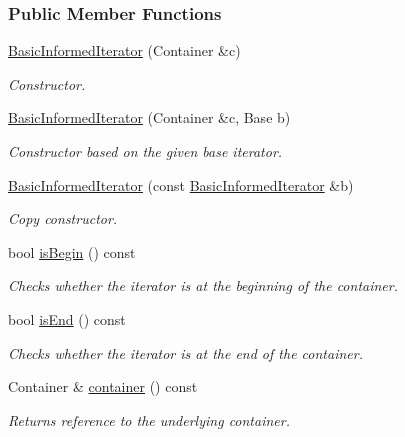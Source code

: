 \subsubsection*{Public Member Functions}
\begin{DoxyCompactItemize}
\item 
\hyperlink{structslb_1_1core_1_1util_1_1BasicInformedIterator_a5df42d0174c2107d33c2c797b6510cd9}{Basic\+Informed\+Iterator} (Container \&c)
\begin{DoxyCompactList}\small\item\em Constructor. \end{DoxyCompactList}\item 
\hyperlink{structslb_1_1core_1_1util_1_1BasicInformedIterator_a1703216a7bd1c0d0a0dd02ed5a946ad9}{Basic\+Informed\+Iterator} (Container \&c, Base b)
\begin{DoxyCompactList}\small\item\em Constructor based on the given base iterator. \end{DoxyCompactList}\item 
\hyperlink{structslb_1_1core_1_1util_1_1BasicInformedIterator_ad87320b140e204fb3a1878ec244fbab2}{Basic\+Informed\+Iterator} (const \hyperlink{structslb_1_1core_1_1util_1_1BasicInformedIterator}{Basic\+Informed\+Iterator} \&b)
\begin{DoxyCompactList}\small\item\em Copy constructor. \end{DoxyCompactList}\item 
bool \hyperlink{structslb_1_1core_1_1util_1_1BasicInformedIterator_ac9c0870a0d2ecea6c987c0c461afb15d}{is\+Begin} () const 
\begin{DoxyCompactList}\small\item\em Checks whether the iterator is at the beginning of the container. \end{DoxyCompactList}\item 
bool \hyperlink{structslb_1_1core_1_1util_1_1BasicInformedIterator_a4a41e1c9f51ce3d202a0c010cefe5984}{is\+End} () const 
\begin{DoxyCompactList}\small\item\em Checks whether the iterator is at the end of the container. \end{DoxyCompactList}\item 
Container \& \hyperlink{structslb_1_1core_1_1util_1_1BasicInformedIterator_a110589c99038df127259fb2e17cb2ba3}{container} () const 
\begin{DoxyCompactList}\small\item\em Returns reference to the underlying container. \end{DoxyCompactList}\item 

\end{DoxyCompactItemize}
